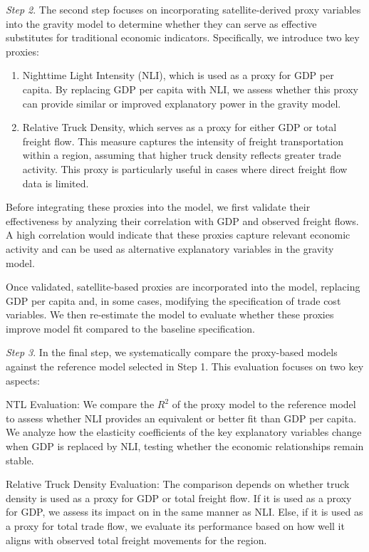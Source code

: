 \textit{Step 2}. The second step focuses on incorporating satellite-derived proxy variables into the gravity model to determine whether they can serve as effective substitutes for traditional economic indicators. Specifically, we introduce two key proxies:
\begin{enumerate}
    \item Nighttime Light Intensity (NLI), which is used as a proxy for GDP per capita. By replacing GDP per capita with NLI, we assess whether this proxy can provide similar or improved explanatory power in the gravity model. %
    \item Relative Truck Density, which serves as a proxy for either GDP or total freight flow. This measure captures the intensity of freight transportation within a region, assuming that higher truck density reflects greater trade activity. This proxy is particularly useful in cases where direct freight flow data is limited.
\end{enumerate}

Before integrating these proxies into the model, we first validate their effectiveness by analyzing their correlation with GDP and observed freight flows. A high correlation would indicate that these proxies capture relevant economic activity and can be used as alternative explanatory variables in the gravity model.

Once validated, satellite-based proxies are incorporated into the model, replacing GDP per capita and, in some cases, modifying the specification of trade cost variables. We then re-estimate the model to evaluate whether these proxies improve model fit compared to the baseline specification.

\textit{Step 3}. In the final step, we systematically compare the proxy-based models against the reference model selected in Step 1. This evaluation focuses on two key aspects:

NTL Evaluation: We compare the $R^2$ of the proxy model to the reference model to assess whether NLI provides an equivalent or better fit than GDP per capita. We analyze how the elasticity coefficients of the key explanatory variables change when GDP is replaced by NLI, testing whether the economic relationships remain stable.

Relative Truck Density Evaluation: The comparison depends on whether truck density is used as a proxy for GDP or total freight flow. If it is used as a proxy for GDP, we assess its impact on in the same manner as NLI. Else, if it is used as a proxy for total trade flow, we evaluate its performance based on how well it aligns with observed total freight movements for the region.

